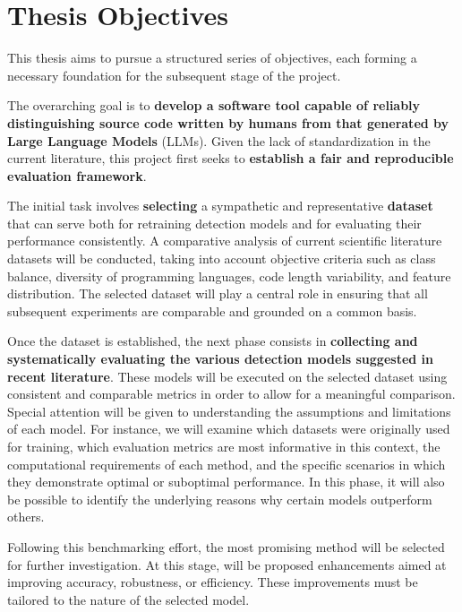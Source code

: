 \clearpage

\section{Thesis Objectives}
This thesis aims to pursue a structured series 
of objectives, each forming a necessary foundation 
for the subsequent stage of the project.

The overarching goal is to \textbf{develop a software 
tool capable of reliably distinguishing source 
code written by humans from that generated by 
Large Language Models} (LLMs). Given the lack of 
standardization in the current literature, this 
project first seeks to \textbf{establish a fair and 
reproducible evaluation framework}.

The initial task involves \textbf{selecting} a 
sympathetic and representative \textbf{dataset} 
that can serve both for retraining detection 
models and for evaluating their performance 
consistently. A comparative analysis of 
current scientific literature datasets 
will be conducted, taking into 
account objective criteria such as class 
balance, diversity of programming languages, 
code length variability, and feature distribution. 
The selected dataset will play a central role in 
ensuring that all subsequent experiments are 
comparable and grounded on a common basis.

Once the dataset is established, the next 
phase consists in \textbf{collecting and systematically 
evaluating the various detection models 
suggested in recent literature}. These models 
will be executed on the selected dataset 
using consistent and comparable metrics in 
order to allow for a meaningful comparison. 
Special attention will be given to 
understanding the assumptions and limitations 
of each model. 
For instance, we will examine 
which datasets were originally used for training, 
which evaluation metrics are most informative 
in this context, the computational requirements 
of each method, and the specific scenarios in 
which they demonstrate optimal or suboptimal performance.
In this phase, it will also be possible to 
identify the underlying reasons why certain 
models outperform others. 

Following this benchmarking effort, the 
most promising method will be selected for 
further investigation. At this stage, will be
proposed enhancements aimed at improving accuracy, 
robustness, or efficiency. These improvements 
must be tailored to the nature of the selected 
model.

